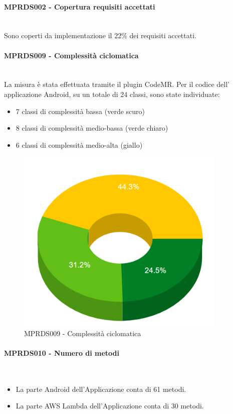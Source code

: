 \paragraph{MPRDS002 - Copertura requisiti accettati}\mbox{}\\[0.4cm]
Sono coperti da implementazione il 22\% dei requisiti accettati.
\paragraph{MPRDS009 - Complessità ciclomatica}\mbox{}\\[0.4cm]
La misura è stata effettuata tramite il plugin CodeMR. Per il codice dell' applicazione Android, su un totale di 24 classi, sono state individuate: \begin{itemize}
\item 7 classi di complessità bassa (verde scuro)
\item 8 classi di complessità medio-bassa (verde chiaro)
\item 6 classi di complessità medio-alta (giallo)
\end{itemize}
\begin{figure}[H]
	\centering
	\includegraphics[width=10cm,keepaspectratio]{../includes/pics/complexity.PNG}
	\caption{\label{fig:mission}MPRDS009 - Complessità ciclomatica}
\end{figure}
\paragraph{MPRDS010 - Numero di metodi}\mbox{}\\[0.4cm]
\begin{itemize}
\item La parte Android dell'Applicazione conta di 61 metodi.
\item La parte AWS Lambda dell'Applicazione conta di 30 metodi.
\end{itemize}

